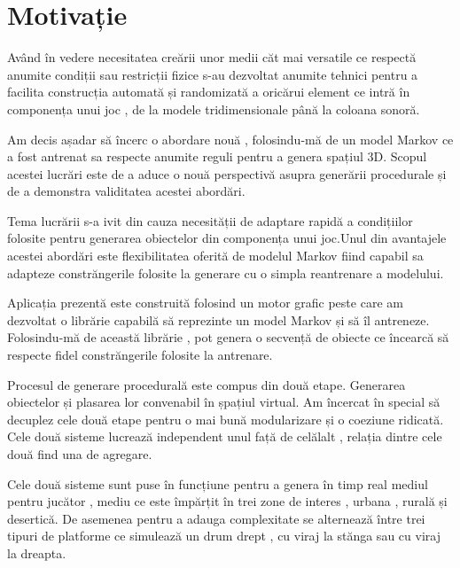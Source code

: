 \chapter*{Motivație} 

Având în vedere necesitatea creării unor medii căt mai versatile ce respectă anumite condiții sau restricții fizice s-au dezvoltat anumite tehnici pentru a facilita construcția automată și randomizată a oricărui element ce intră în componența unui joc , de la modele tridimensionale până la coloana sonoră.\par

Am decis așadar să încerc o abordare nouă , folosindu-mă de un model Markov ce a fost antrenat sa respecte anumite reguli pentru a genera spațiul 3D. Scopul acestei lucrări este de a aduce o nouă perspectivă asupra generării procedurale și de a demonstra validitatea acestei abordări.\par

Tema lucrării s-a ivit din cauza necesității de adaptare rapidă a condițiilor folosite pentru generarea obiectelor din componența unui joc.Unul din avantajele acestei abordări este flexibilitatea oferită de modelul Markov fiind capabil sa adapteze constrăngerile folosite la generare cu o simpla reantrenare a modelului.\par

Aplicația prezentă este construită folosind un motor grafic peste care am dezvoltat o librărie capabilă să reprezinte un model Markov și să îl antreneze. Folosindu-mă de această librărie , pot genera o secvență de obiecte ce încearcă să respecte fidel constrăngerile folosite la antrenare.\par

Procesul de generare procedurală este compus din două etape. Generarea obiectelor și plasarea lor convenabil în șpațiul virtual. Am încercat în special să decuplez cele două etape pentru o mai bună modularizare și o coeziune ridicată. Cele două sisteme lucrează independent unul față de celălalt , relația dintre cele două find una de agregare.

Cele două sisteme sunt puse în funcțiune pentru a genera în timp real mediul pentru jucător , mediu ce este împărțit în trei zone de interes , urbana , rurală și desertică. De asemenea pentru a adauga complexitate se alternează între trei tipuri de platforme ce simulează un drum drept , cu viraj la stănga sau cu viraj la dreapta.\par



